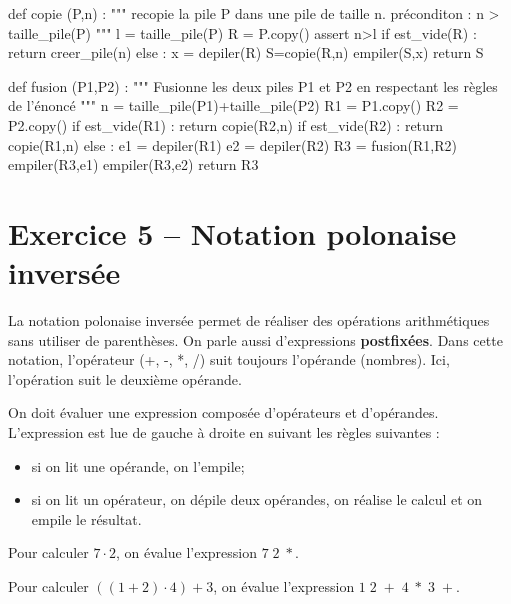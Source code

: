 \begin{corrige}

\begin{python}
def copie (P,n) :
    """ recopie la pile P dans une pile de taille n.
    préconditon : n > taille_pile(P) """
    l = taille_pile(P)
    R = P.copy()
    assert n>l
    if est_vide(R) :
        return creer_pile(n)
    else :
        x = depiler(R)
        S=copie(R,n)
        empiler(S,x)
        return S

def fusion (P1,P2) :
    """ Fusionne les deux piles P1 et P2 en respectant
    les règles de l'énoncé """
    n = taille_pile(P1)+taille_pile(P2)
    R1 = P1.copy()
    R2 = P2.copy()
    if est_vide(R1) :
        return copie(R2,n)
    if est_vide(R2) :
        return copie(R1,n)
    else :        
        e1 = depiler(R1)
        e2 = depiler(R2)
        R3 = fusion(R1,R2)
        empiler(R3,e1)
        empiler(R3,e2)
        return R3
\end{python} 

\end{corrige}

\else \fi



\section*{Exercice 5 -- Notation polonaise inversée}

\ifprof
\else
\setcounter{exo}{0}
La notation polonaise inversée permet de réaliser des opérations arithmétiques sans utiliser de parenthèses. On parle aussi d'expressions \textbf{postfixées}. Dans cette notation, l'opérateur (+, -, *, /) suit toujours l'opérande (nombres). Ici, l'opération suit le deuxième opérande.

On doit évaluer une expression composée d'opérateurs et d'opérandes. L'expression est lue de gauche à droite en suivant les règles suivantes :
\begin{itemize}
\item si on lit une opérande, on l'empile;
\item si on lit un opérateur, on dépile deux opérandes, on réalise le calcul et on empile le résultat. 
\end{itemize}
\begin{exemple}
Pour calculer $7\cdot 2$, on évalue l'expression $7\;2\; *$.

Pour calculer $((1 + 2) \cdot 4) + 3$, on évalue l'expression $1\;2\;+\;4\;*\;3\;+$.
\end{exemple} 


